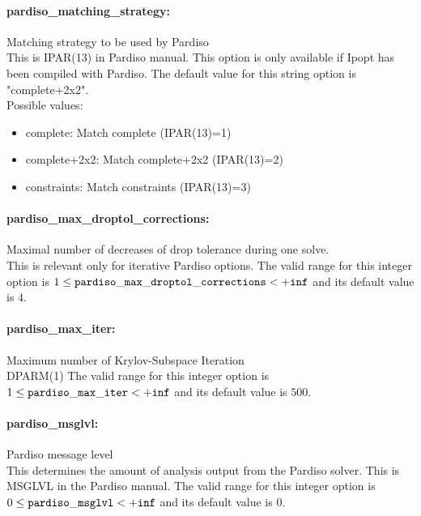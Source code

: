 \paragraph{pardiso\_matching\_strategy:}\label{sec:pardiso_matching_strategy} Matching strategy to be used by Pardiso $\;$ \\
 This is IPAR(13) in Pardiso manual.  This option
is only available if Ipopt has been compiled with
Pardiso.
The default value for this string option is "complete+2x2".
\\ 
Possible values:
\begin{itemize}
   \item complete: Match complete (IPAR(13)=1)
   \item complete+2x2: Match complete+2x2 (IPAR(13)=2)
   \item constraints: Match constraints (IPAR(13)=3)
\end{itemize}

\paragraph{pardiso\_max\_droptol\_corrections:}\label{sec:pardiso_max_droptol_corrections} Maximal number of decreases of drop tolerance during one solve. $\;$ \\
 This is relevant only for iterative Pardiso
options. The valid range for this integer option is
$1 \le {\tt pardiso\_max\_droptol\_corrections } <  {\tt +inf}$
and its default value is $4$.


\paragraph{pardiso\_max\_iter:}\label{sec:pardiso_max_iter} Maximum number of Krylov-Subspace Iteration $\;$ \\
 DPARM(1) The valid range for this integer option is
$1 \le {\tt pardiso\_max\_iter } <  {\tt +inf}$
and its default value is $500$.


\paragraph{pardiso\_msglvl:}\label{sec:pardiso_msglvl} Pardiso message level $\;$ \\
 This determines the amount of analysis output
from the Pardiso solver. This is MSGLVL in the
Pardiso manual. The valid range for this integer option is
$0 \le {\tt pardiso\_msglvl } <  {\tt +inf}$
and its default value is $0$.


